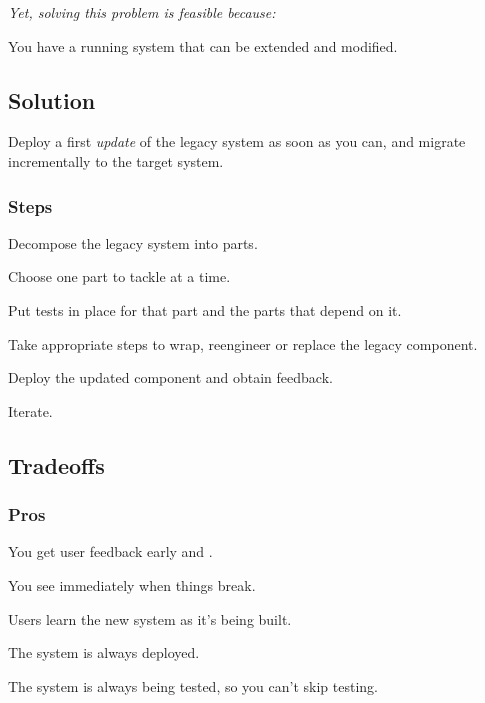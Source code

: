 \documentclass[a4paper,10pt,twoside]{book}
\begin{document}
\emph{Yet, solving this problem is feasible because:}

\begin{bulletlist}
\item You have a running system that can be extended and modified.
\end{bulletlist}

\subsection*{Solution}

Deploy a first \emph{update} of the legacy system as soon as you can, and migrate incrementally to the target system.

\subsubsection*{Steps}

\begin{bulletlist}
\item Decompose the legacy system into parts.

\item Choose one part to tackle at a time.

\item Put tests in place for that part and the parts that depend on it.

\item Take appropriate steps to wrap, reengineer or replace the legacy component.

\item Deploy the updated component and obtain feedback.

\item Iterate.
\end{bulletlist}

\subsection*{Tradeoffs}

\subsubsection*{Pros}

\begin{bulletlist}
\item You get user feedback early and .

\item You see immediately when things break.

\item Users learn the new system as it's being built.

\item The system is always deployed.

\item The system is always being tested, so you can't skip testing.
\end{bulletlist}
\end{document}
